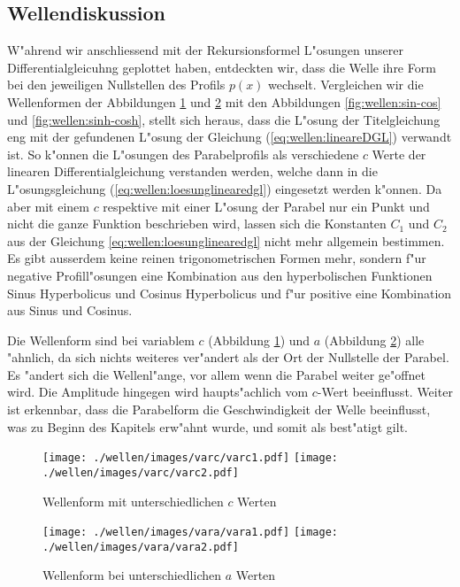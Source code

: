 \subsection{Wellendiskussion}
\label{sec:wellen:diskussionwellenform}

W"ahrend wir anschliessend mit der Rekursionsformel L"osungen unserer 
Differentialgleicuhng geplottet haben, entdeckten wir, dass die Welle ihre Form 
bei den jeweiligen Nullstellen des Profils $p(x)$ wechselt. Vergleichen wir die 
Wellenformen der Abbildungen \ref{fig:wellen:variablec} und 
\ref{fig:wellen:variablea} mit den Abbildungen \ref{fig:wellen:sin-cos} und 
\ref{fig:wellen:sinh-cosh}, stellt sich heraus, dass die L"osung der 
Titelgleichung eng mit der gefundenen L"osung der Gleichung 
(\ref{eq:wellen:lineareDGL}) verwandt ist. So k"onnen die L"osungen des 
Parabelprofils als verschiedene $c$ Werte der linearen Differentialgleichung 
verstanden werden, welche dann in die L"osungsgleichung 
(\ref{eq:wellen:loesunglinearedgl}) eingesetzt werden k"onnen. 
Da aber mit einem $c$ respektive mit einer L"osung der Parabel nur ein Punkt 
und nicht die ganze Funktion beschrieben wird, lassen sich die Konstanten $C_1$ 
und $C_2$ aus der Gleichung \ref{eq:wellen:loesunglinearedgl} nicht mehr 
allgemein bestimmen. Es gibt ausserdem keine reinen trigonometrischen Formen 
mehr, sondern f"ur negative Profill"osungen eine Kombination aus den 
hyperbolischen Funktionen Sinus Hyperbolicus und Cosinus Hyperbolicus und f"ur 
positive eine Kombination aus Sinus und Cosinus.

Die Wellenform sind bei variablem $c$ (Abbildung \ref{fig:wellen:variablec}) 
und $a$ (Abbildung \ref{fig:wellen:variablea}) alle "ahnlich, da sich nichts 
weiteres ver"andert als der Ort der Nullstelle der Parabel. Es "andert sich die 
Wellenl"ange, vor allem wenn die Parabel weiter ge"offnet wird. Die Amplitude 
hingegen wird haupts"achlich vom $c$-Wert beeinflusst. Weiter ist erkennbar, 
dass die Parabelform die Geschwindigkeit der Welle beeinflusst, was zu Beginn 
des Kapitels erw"ahnt wurde, und somit als best"atigt gilt.

\begin{figure}
	\texttt{[image: ./wellen/images/varc/varc1.pdf]}
	\texttt{[image: ./wellen/images/varc/varc2.pdf]}
	\caption{Wellenform mit unterschiedlichen $c$ Werten}
	\label{fig:wellen:variablec}
\end{figure}

\begin{figure}
	\texttt{[image: ./wellen/images/vara/vara1.pdf]}
	\texttt{[image: ./wellen/images/vara/vara2.pdf]}
	\caption{Wellenform bei unterschiedlichen $a$ Werten}
	\label{fig:wellen:variablea}
\end{figure}


